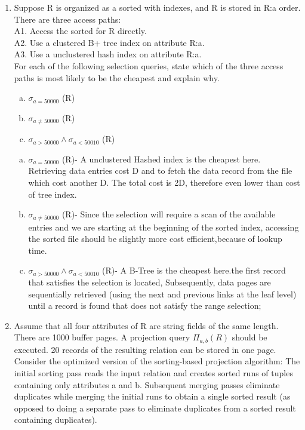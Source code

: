\documentclass[10pt]{article}
\begin{document}
	\begin{enumerate}
		\item Suppose R is organized as a sorted with indexes, and R is stored in R:a order. There are
		three access paths:\\
		A1. Access the sorted for R directly.\\
		A2. Use a clustered B+ tree index on attribute R:a.\\
		A3. Use a unclustered hash index on attribute R:a.\\
		
		For each of the following selection queries, state which of the three access paths is most likely
		to be the cheapest and explain why.
			\begin{enumerate}[(a)]
				\item $ \sigma_{a=50000}$ (R)
				\item $ \sigma_{a\neq50000}$ (R)
				\item $ \sigma_{a>50000 } \land \sigma_{a<50010}$ (R)
				
					\end{enumerate}
		
			\begin{enumerate}[(a)]
			\item $ \sigma_{a=50000}$ (R)- A unclustered Hashed index is the cheapest here. Retrieving data entries cost D and to fetch the data record from the file which cost another D. The total cost is 2D, therefore even lower than cost of tree index.
			\item $ \sigma_{a\neq50000}$ (R)- Since the selection will require a scan of the available entries and we are starting at the beginning of the sorted index, accessing the sorted file should be slightly more cost efficient,because of lookup time.
			\item $ \sigma_{a>50000 } \land \sigma_{a<50010}$ (R)- A B-Tree is the cheapest here.the first record that satisfies the selection is located, Subsequently, data pages are sequentially
			retrieved (using the next and previous links at the leaf level) until a record is
			found that does not satisfy the range selection;
			
			
		\end{enumerate}
		
		\clearpage
		
		\item Assume that all four attributes of R are string fields of the same length. There are 1000 buffer
		pages. A projection query $\Pi_{a,b}(R)$ should be executed. 20 records of the resulting relation
		can be stored in one page. Consider the optimized version of the sorting-based projection
		algorithm: The initial sorting pass reads the input relation and creates sorted runs of tuples
		containing only attributes a and b. Subsequent merging passes eliminate duplicates while
		merging the initial runs to obtain a single sorted result (as opposed to doing a separate pass
		to eliminate duplicates from a sorted result containing duplicates).
		

\end{enumerate}
\end{document}
